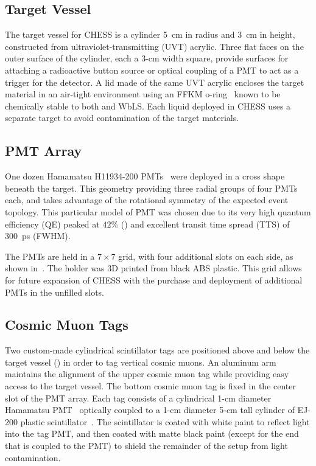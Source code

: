 \subsection{Target Vessel}
The target vessel for CHESS is a cylinder 5~cm in radius and 3~cm in height, constructed from ultraviolet-transmitting (UVT) acrylic. 
Three flat faces on the outer surface of the cylinder, each a 3-cm width square, provide surfaces for attaching a radioactive button source or optical coupling of a PMT to act as a trigger for the detector. 
A lid made of the same UVT acrylic encloses the target material in an air-tight environment using an FFKM o-ring~\cite{cog-oring} known to be chemically stable to both {\labppo} and WbLS. 
Each liquid deployed in CHESS uses a separate target to avoid contamination of the target materials.

\subsection{PMT Array}
\label{pmtarray}

One dozen Hamamatsu H11934-200 PMTs~\cite{h11934} were deployed in a cross shape beneath the target.
This geometry providing three radial groups of four PMTs each, and takes advantage of the rotational symmetry of the expected event topology. 
This particular model of PMT was chosen due to its very high quantum efficiency (QE) peaked at $42\%$ () and excellent transit time spread (TTS) of 300~ps (FWHM).

The PMTs are held in a $7 \times 7$ grid, with four additional slots on each side, as shown in~. 
The holder was 3D printed from black ABS plastic.
This grid allows for future expansion of CHESS with the purchase and deployment of additional PMTs in the unfilled slots.

\subsection{Cosmic Muon Tags}

Two custom-made cylindrical scintillator tags are positioned above and below the target vessel () in order to tag vertical cosmic muons.  
An aluminum arm maintains the alignment of the upper cosmic muon tag while providing easy access to the target vessel.
The bottom cosmic muon tag is fixed in the center slot of the PMT array. 
Each tag consists of a cylindrical 1-cm diameter Hamamatsu PMT~\cite{h3164} optically coupled to a 1-cm diameter 5-cm tall cylinder of EJ-200 plastic scintillator~\cite{ej200}.
The scintillator is coated with white paint to reflect light into the tag PMT, and then coated with matte black paint (except for the end that is coupled to the PMT) to shield the remainder of the setup from light contamination. 

